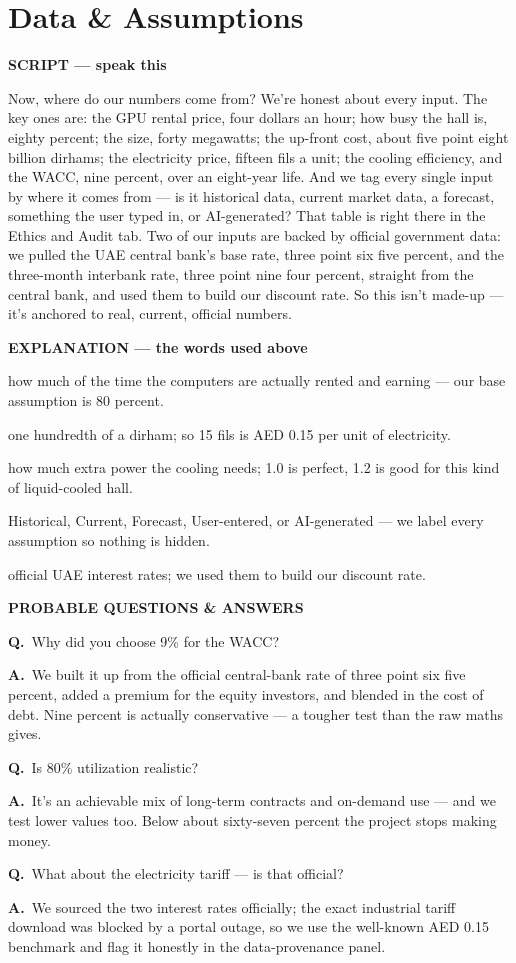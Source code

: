 \documentclass[12pt,a4paper]{article}
\newcommand{\block}[2]{\par\medskip\noindent\textcolor{#1}{\textbf{#2}}\par\nobreak\smallskip}
\newcommand{\SC}{\block{tvblue}{SCRIPT --- speak this}}
\newcommand{\EX}{\block{tvgreen}{EXPLANATION --- the words used above}}
\newcommand{\PQ}{\block{tvamber}{PROBABLE QUESTIONS \& ANSWERS}}
\newcommand{\qa}[2]{\par\noindent\textbf{Q.}~#1\par\noindent\textbf{A.}~#2\par\smallskip}
\newenvironment{terms}{\begin{description}[leftmargin=0pt,itemsep=2pt,font=\normalfont\bfseries]}{\end{description}}
\begin{document}
\section{Data \& Assumptions}

\SC
Now, where do our numbers come from? We're honest about every input. The key ones are: the GPU rental
price, four dollars an hour; how busy the hall is, eighty percent; the size, forty megawatts; the
up-front cost, about five point eight billion dirhams; the electricity price, fifteen fils a unit;
the cooling efficiency, and the WACC, nine percent, over an eight-year life. And we tag every single
input by where it comes from --- is it historical data, current market data, a forecast, something the
user typed in, or AI-generated? That table is right there in the Ethics and Audit tab. Two of our
inputs are backed by official government data: we pulled the UAE central bank's base rate, three point
six five percent, and the three-month interbank rate, three point nine four percent, straight from the
central bank, and used them to build our discount rate. So this isn't made-up --- it's anchored to
real, current, official numbers.

\EX
\begin{terms}
  \item[Utilization (80\%):] how much of the time the computers are actually rented and earning ---
  our base assumption is 80 percent.
  \item[Fils:] one hundredth of a dirham; so 15 fils is AED 0.15 per unit of electricity.
  \item[PUE (cooling efficiency):] how much extra power the cooling needs; 1.0 is perfect, 1.2 is
  good for this kind of liquid-cooled hall.
  \item[Data tags (H/C/F/U/AI):] Historical, Current, Forecast, User-entered, or AI-generated --- we
  label every assumption so nothing is hidden.
  \item[Central bank base rate / EIBOR:] official UAE interest rates; we used them to build our
  discount rate.
\end{terms}

\PQ
\qa{Why did you choose 9\% for the WACC?}{We built it up from the official central-bank rate of three
point six five percent, added a premium for the equity investors, and blended in the cost of debt.
Nine percent is actually conservative --- a tougher test than the raw maths gives.}
\qa{Is 80\% utilization realistic?}{It's an achievable mix of long-term contracts and on-demand use ---
and we test lower values too. Below about sixty-seven percent the project stops making money.}
\qa{What about the electricity tariff --- is that official?}{We sourced the two interest rates
officially; the exact industrial tariff download was blocked by a portal outage, so we use the
well-known AED 0.15 benchmark and flag it honestly in the data-provenance panel.}
\end{document}
